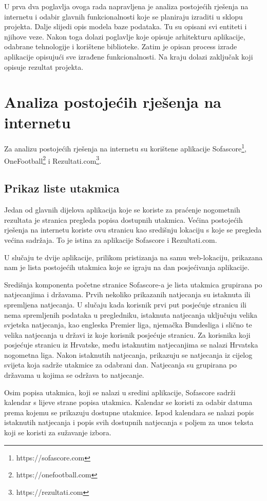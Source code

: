 \documentclass[times, utf8, zavrsni]{fer}
\begin{document}
U prva dva poglavlja ovoga rada napravljena je analiza postojećih rješenja na internetu i odabir glavnih funkcionalnosti koje se planiraju izraditi u sklopu projekta.
Dalje slijedi opis modela baze podataka. Tu su opisani svi entiteti i njihove veze. Nakon toga dolazi poglavlje koje opisuje arhitekturu aplikacije, odabrane tehnologije i korištene biblioteke.
Zatim je opisan process izrade aplikacije opisujući sve izrađene funkcionalnosti. Na kraju dolazi zaključak koji opisuje rezultat projekta.

\chapter{Analiza postojećih rješenja na internetu}
Za analizu postojećih rješenja na internetu su korištene aplikacije Sofascore\footnote{https://sofascore.com}, OneFootball\footnote{https://onefootball.com} i Rezultati.com\footnote{https://rezultati.com}.

\section{Prikaz liste utakmica}

Jedan od glavnih dijelova aplikacija koje se koriste za praćenje nogometnih rezultata je stranica pregleda popisa dostupnih utakmica.
Većina postojećih rješenja na internetu koriste ovu stranicu kao središnju lokaciju s koje se pregleda većina sadržaja. To je istina za aplikacije Sofascore i Rezultati.com.

U slučaju te dvije aplikacije, prilikom pristizanja na samu web-lokaciju, prikazana nam je lista postojećih utakmica koje se igraju na dan posjećivanja aplikacije.

Središnja komponenta početne stranice Sofascore-a je lista utakmica grupirana po natjecanjima i državama. Prvih nekoliko prikazanih natjecanja su istaknuta ili spremljena natjecanja.
U slučaju kada korisnik prvi put posjećuje stranicu ili nema spremljenih podataka u pregledniku, istaknuta natjecanja uključuju velika svjetska natjecanja,
kao engleska Premier liga, njemačka Bundesliga i slično te velika natjecanja u državi iz koje korisnik posjećuje stranicu.
Za korisnika koji posjećuje stranicu iz Hrvatske, među istaknutim natjecanjima se nalazi Hrvatska nogometna liga.
Nakon istaknutih natjecanja, prikazuju se natjecanja iz cijelog svijeta koja sadrže utakmice za odabrani dan. Natjecanja su grupirana po državama u kojima se održava to natjecanje.

Osim popisa utakmica, koji se nalazi u sredini aplikacije, Sofascore sadrži kalendar s lijeve strane popisa utakmica.
Kalendar se koristi za odabir datuma prema kojemu se prikazuju dostupne utakmice.
Ispod kalendara se nalazi popis istaknutih natjecanja i popis svih dostupnih natjecanja s poljem za unos teksta koji se koristi za sužavanje izbora.
\end{document}
